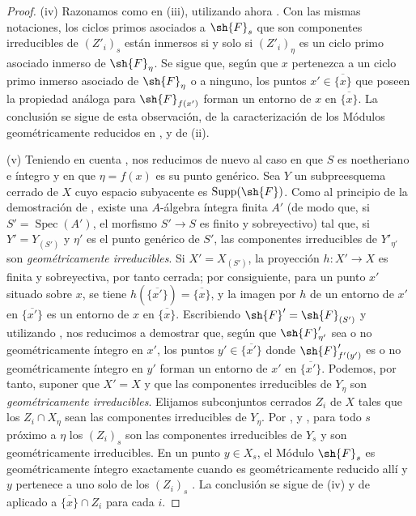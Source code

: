 \begin{proof}
(iv) Razonamos como en (iii), utilizando ahora .
Con las mismas notaciones, los ciclos primos asociados a $\sh{F}_s$ que son componentes irreducibles de $(Z'_i)_s$ están inmersos si y solo si $(Z'_i)_\eta$ es un ciclo primo asociado inmerso de $\sh{F}_\eta$.
Se sigue que, según que $x$ pertenezca a un ciclo primo inmerso asociado de $\sh{F}_\eta$ o a ninguno, los puntos $x'\in\overline{\{x\}}$ que poseen la propiedad análoga para $\sh{F}_{f(x')}$ forman un entorno de $x$ en $\overline{\{x\}}$.
La conclusión se sigue de esta observación, de la caracterización de los Módulos geométricamente reducidos en , y de (ii).

(v) Teniendo en cuenta , nos reducimos de nuevo al caso en que $S$ es noetheriano e íntegro y en que $\eta=f(x)$ es su punto genérico.
Sea $Y$ un subpreesquema cerrado de $X$ cuyo espacio subyacente es $\operatorname{Supp}(\sh{F})$.
Como al principio de la demostración de , existe una $A$-álgebra íntegra finita $A'$ (de modo que, si $S'=\operatorname{Spec}(A')$, el morfismo $S'\to S$ es finito y sobreyectivo) tal que, si $Y'=Y_{(S')}$ y $\eta'$ es el punto genérico de $S'$, las componentes irreducibles de $Y'_{\eta'}$ son \emph{geométricamente irreducibles}.
Si $X'=X_{(S')}$, la proyección $h:X'\to X$ es finita y sobreyectiva, por tanto cerrada; por consiguiente, para un punto $x'$ situado sobre $x$, se tiene $h(\overline{\{x'\}})=\overline{\{x\}}$, y la imagen por $h$ de un entorno de $x'$ en $\overline{\{x'\}}$ es un entorno de $x$ en $\overline{\{x\}}$.
Escribiendo $\sh{F}'=\sh{F}_{(S')}$ y utilizando , nos reducimos a demostrar que, según que $\sh{F}'_{\eta'}$ sea o no geométricamente íntegro en $x'$, los puntos $y'\in\overline{\{x'\}}$ donde $\sh{F}'_{f'(y')}$ es o no geométricamente íntegro en $y'$ forman un entorno de $x'$ en $\overline{\{x'\}}$.
Podemos, por tanto, suponer que $X'=X$ y que las componentes irreducibles de $Y_\eta$ son \emph{geométricamente irreducibles}.
Elijamos subconjuntos cerrados $Z_i$ de $X$ tales que los $Z_i\cap X_\eta$ sean las
  componentes irreducibles de $Y_\eta$.
Por ,  y , para todo $s$ próximo a $\eta$ los $(Z_i)_s$ son las componentes irreducibles de $Y_s$ y son geométricamente irreducibles.
En un punto $y\in X_s$, el Módulo $\sh{F}_s$ es geométricamente íntegro exactamente cuando es geométricamente reducido allí y $y$ pertenece a uno solo de los $(Z_i)_s$ .
La conclusión se sigue de (iv) y de  aplicado a $\overline{\{x\}}\cap Z_i$ para cada $i$.


\end{proof}
